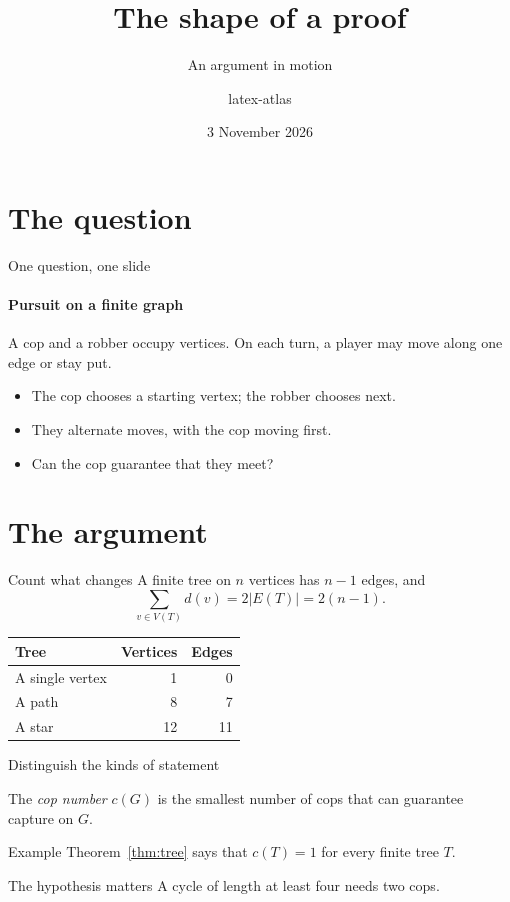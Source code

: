\documentclass[aspectratio=169,12pt]{beamer}
\title{The shape of a proof}
\subtitle{An argument in motion}
\author{latex-atlas}
\institute{A typographic experiment in Beamer}
\date{3 November 2026}
\begin{document}
\begin{frame}
  \titlepage
\end{frame}

\section{The question}
\begin{frame}{One question, one slide}
  \framesubtitle{Pursuit on a finite graph}
  A cop and a robber occupy vertices. On each turn, a player may move
  along one edge or stay put.
  \begin{itemize}[<+->]
    \item The cop chooses a starting vertex; the robber chooses next.
    \item They alternate moves, with the cop moving first.
    \item Can the cop guarantee that they meet?
  \end{itemize}
  \medskip
\end{frame}

\section{The argument}


\begin{frame}{Count what changes}
  A finite tree on $n$ vertices has $n-1$ edges, and
  \[
    \sum_{v\in V(T)} d(v)=2|E(T)|=2(n-1).
  \]
  \medskip
  \begin{center}
    \begin{tabular}{lrr}
      \toprule
      Tree & Vertices & Edges \\
      \midrule
      A single vertex & 1 & 0 \\
      A path & 8 & 7 \\
      A star & 12 & 11 \\
      \bottomrule
    \end{tabular}
  \end{center}
\end{frame}

\begin{frame}{Distinguish the kinds of statement}
  \begin{definition}
    The \emph{cop number} $c(G)$ is the smallest number of cops that can
    guarantee capture on $G$.
  \end{definition}
  \begin{exampleblock}{Example}
    Theorem~\ref{thm:tree} says that $c(T)=1$ for every finite tree $T$.
  \end{exampleblock}
  \begin{alertblock}{The hypothesis matters}
    A cycle of length at least four needs two cops.
  \end{alertblock}
\end{frame}
\end{document}
